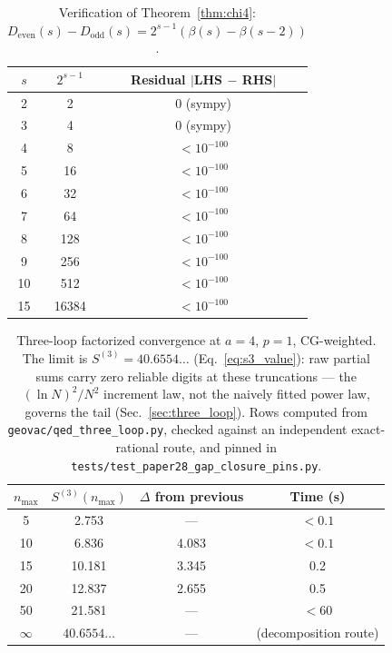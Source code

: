 \documentclass[11pt]{article}
\begin{document}
\begin{table}[h]
\centering
\caption{Verification of Theorem~\ref{thm:chi4}: $D_{\mathrm{even}}(s) -
D_{\mathrm{odd}}(s) = 2^{s-1}(\beta(s) - \beta(s{-}2))$.}
\label{tab:chi4_verification}
\begin{tabular}{@{}ccc@{}}
\toprule
$s$ & $2^{s-1}$ & Residual $|$LHS $-$ RHS$|$ \\
\midrule
2 & 2 & 0 (sympy) \\
3 & 4 & 0 (sympy) \\
4 & 8 & $< 10^{-100}$ \\
5 & 16 & $< 10^{-100}$ \\
6 & 32 & $< 10^{-100}$ \\
7 & 64 & $< 10^{-100}$ \\
8 & 128 & $< 10^{-100}$ \\
9 & 256 & $< 10^{-100}$ \\
10 & 512 & $< 10^{-100}$ \\
15 & 16384 & $< 10^{-100}$ \\
\bottomrule
\end{tabular}
\end{table}

\begin{table}[h]
\centering
\caption{Three-loop factorized convergence at $a = 4$, $p = 1$,
CG-weighted.  The limit is $S^{(3)} = 40.6554\ldots$
(Eq.~\eqref{eq:s3_value}): raw partial sums carry zero reliable digits
at these truncations --- the $(\ln N)^2/N^2$ increment law, not the
naively fitted power law, governs the tail
(Sec.~\ref{sec:three_loop}).  Rows computed from
\texttt{geovac/qed\_three\_loop.py}, checked against an independent
exact-rational route, and pinned in
\texttt{tests/test\_paper28\_gap\_closure\_pins.py}.}
\label{tab:three_loop_convergence}
\begin{tabular}{@{}cccc@{}}
\toprule
$n_{\max}$ & $S^{(3)}(n_{\max})$ & $\Delta$ from previous & Time (s) \\
\midrule
5  & 2.753 & --- & $< 0.1$ \\
10 & 6.836 & 4.083 & $< 0.1$ \\
15 & 10.181 & 3.345 & 0.2 \\
20 & 12.837 & 2.655 & 0.5 \\
50 & 21.581 & --- & $< 60$ \\
$\infty$ & $40.6554\ldots$ & --- & (decomposition route) \\
\bottomrule
\end{tabular}
\end{table}
\end{document}
